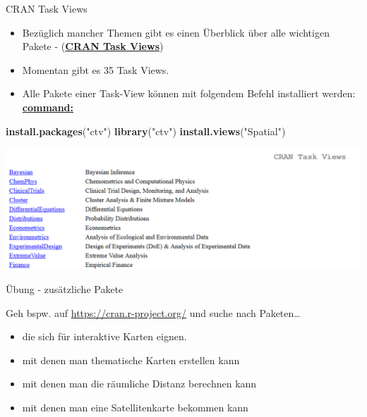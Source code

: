 \documentclass[ignorenonframetext,]{beamer}
\newenvironment{Shaded}{\begin{snugshade}}{\end{snugshade}}
\newcommand{\KeywordTok}[1]{\textcolor[rgb]{0.26,0.66,0.93}{\textbf{#1}}}
\newcommand{\NormalTok}[1]{\textcolor[rgb]{0.74,0.68,0.62}{#1}}
\newcommand{\StringTok}[1]{\textcolor[rgb]{0.02,0.61,0.04}{#1}}
\providecommand{\tightlist}{%
  \setlength{\itemsep}{0pt}\setlength{\parskip}{0pt}}
\begin{document}
\begin{frame}[fragile]{CRAN Task Views}
\protect\hypertarget{cran-task-views}{}

\begin{itemize}
\tightlist
\item
  Bezüglich mancher Themen gibt es einen Überblick über alle wichtigen
  Pakete - (\href{https://cran.r-project.org/web/views/}{\textbf{CRAN
  Task Views}})
\item
  Momentan gibt es 35 Task Views.
\item
  Alle Pakete einer Task-View können mit folgendem Befehl installiert
  werden:
  \href{https://mran.microsoft.com/rpackages/}{\textbf{command:}}
\end{itemize}

\begin{Shaded}
\begin{Highlighting}[]
\KeywordTok{install.packages}\NormalTok{(}\StringTok{"ctv"}\NormalTok{)}
\KeywordTok{library}\NormalTok{(}\StringTok{"ctv"}\NormalTok{)}
\KeywordTok{install.views}\NormalTok{(}\StringTok{"Spatial"}\NormalTok{)}
\end{Highlighting}
\end{Shaded}

\includegraphics{figure/CRANtaskViews.PNG}

\end{frame}

\begin{frame}{Übung - zusätzliche Pakete}
\protect\hypertarget{ubung---zusatzliche-pakete}{}

Geh bspw. auf \url{https://cran.r-project.org/} und suche nach
Paketen\ldots{}

\begin{itemize}
\tightlist
\item
  die sich für interaktive Karten eignen.
\item
  mit denen man thematische Karten erstellen kann
\item
  mit denen man die räumliche Distanz berechnen kann
\item
  mit denen man eine Satellitenkarte bekommen kann
\end{itemize}

\end{frame}
\end{document}
